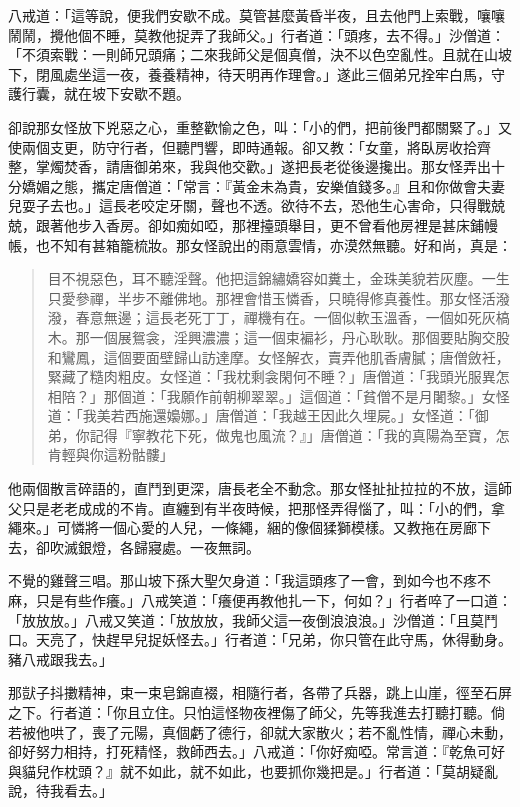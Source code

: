 八戒道：「這等說，便我們安歇不成。莫管甚麼黃昏半夜，且去他門上索戰，嚷嚷鬧鬧，攪他個不睡，莫教他捉弄了我師父。」行者道：「頭疼，去不得。」沙僧道：「不須索戰：一則師兄頭痛；二來我師父是個真僧，決不以色空亂性。且就在山坡下，閉風處坐這一夜，養養精神，待天明再作理會。」遂此三個弟兄拴牢白馬，守護行囊，就在坡下安歇不題。

卻說那女怪放下兇惡之心，重整歡愉之色，叫：「小的們，把前後門都關緊了。」又使兩個支更，防守行者，但聽門響，即時通報。卻又教：「女童，將臥房收拾齊整，掌燭焚香，請唐御弟來，我與他交歡。」遂把長老從後邊攙出。那女怪弄出十分嬌媚之態，攜定唐僧道：「常言：『黃金未為貴，安樂值錢多。』且和你做會夫妻兒耍子去也。」這長老咬定牙關，聲也不透。欲待不去，恐他生心害命，只得戰兢兢，跟著他步入香房。卻如痴如啞，那裡擡頭舉目，更不曾看他房裡是甚床鋪幔帳，也不知有甚箱籠梳妝。那女怪說出的雨意雲情，亦漠然無聽。好和尚，真是：
\begin{quote}
目不視惡色，耳不聽淫聲。他把這錦繡嬌容如糞土，金珠美貌若灰塵。一生只愛參禪，半步不離佛地。那裡會惜玉憐香，只曉得修真養性。那女怪活潑潑，春意無邊；這長老死丁丁，禪機有在。一個似軟玉溫香，一個如死灰槁木。那一個展鴛衾，淫興濃濃；這一個束褊衫，丹心耿耿。那個要貼胸交股和鸞鳳，這個要面壁歸山訪達摩。女怪解衣，賣弄他肌香膚膩；唐僧斂衽，緊藏了糙肉粗皮。女怪道：「我枕剩衾閑何不睡？」唐僧道：「我頭光服異怎相陪？」那個道：「我願作前朝柳翠翠。」這個道：「貧僧不是月闍黎。」女怪道：「我美若西施還嬝娜。」唐僧道：「我越王因此久埋屍。」女怪道：「御弟，你記得『寧教花下死，做鬼也風流？』」唐僧道：「我的真陽為至寶，怎肯輕與你這粉骷髏」
\end{quote}

他兩個散言碎語的，直鬥到更深，唐長老全不動念。那女怪扯扯拉拉的不放，這師父只是老老成成的不肯。直纏到有半夜時候，把那怪弄得惱了，叫：「小的們，拿繩來。」可憐將一個心愛的人兒，一條繩，綑的像個猱獅模樣。又教拖在房廊下去，卻吹滅銀燈，各歸寢處。一夜無詞。

不覺的雞聲三唱。那山坡下孫大聖欠身道：「我這頭疼了一會，到如今也不疼不麻，只是有些作癢。」八戒笑道：「癢便再教他扎一下，何如？」行者啐了一口道：「放放放。」八戒又笑道：「放放放，我師父這一夜倒浪浪浪。」沙僧道：「且莫鬥口。天亮了，快趕早兒捉妖怪去。」行者道：「兄弟，你只管在此守馬，休得動身。豬八戒跟我去。」

那獃子抖擻精神，束一束皂錦直裰，相隨行者，各帶了兵器，跳上山崖，徑至石屏之下。行者道：「你且立住。只怕這怪物夜裡傷了師父，先等我進去打聽打聽。倘若被他哄了，喪了元陽，真個虧了德行，卻就大家散火；若不亂性情，禪心未動，卻好努力相持，打死精怪，救師西去。」八戒道：「你好痴啞。常言道：『乾魚可好與貓兒作枕頭？』就不如此，就不如此，也要抓你幾把是。」行者道：「莫胡疑亂說，待我看去。」

